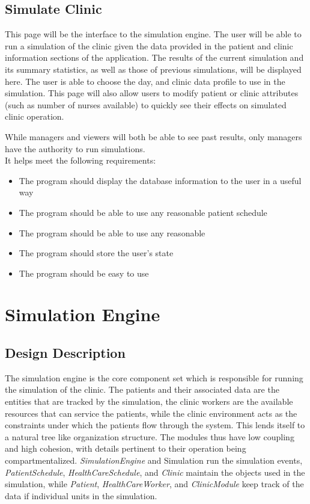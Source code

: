 \documentclass[12pt]{article}
\begin{document}
\subsection{Simulate Clinic}
This page will be the interface to the simulation engine. The user will be able to run a simulation of the clinic given the data provided in the patient and clinic information sections of the application. The results of the current simulation and its summary statistics, as well as those of previous simulations, will be displayed here. The user is able to choose the day, and clinic data profile to use in the simulation. This page will also allow users to modify patient or clinic attributes (such as number of nurses available) to quickly see their effects on simulated clinic operation. 

\noindent \newline
While managers and viewers will both be able to see past results, only managers have the authority to run simulations.
\\
It helps meet the following requirements:
\begin{itemize}
	\item The program should display the database information to the user in a useful way
	\item The program should be able to use any reasonable patient schedule
	\item The program should be able to use any reasonable
	\item The program should store the user's state
	\item The program should be easy to use
\end{itemize}

\section{Simulation Engine}

\subsection{Design Description}
The simulation engine is the core component set which is responsible for running the simulation of the clinic. The patients and their associated data are the entities that are tracked by the simulation, the clinic workers are the available resources that can service the patients, while the clinic environment acts as the constraints under which the patients flow through the system. This lends itself to a natural tree like organization structure. The modules thus have low coupling and high cohesion, with details pertinent to their operation being compartmentalized. \textit{SimulationEngine} and Simulation run the simulation events, \textit{PatientSchedule},\textit{ HealthCareSchedule}, and \textit{Clinic} maintain the objects used in the simulation, while \textit{Patient}, \textit{HealthCareWorker}, and \textit{ClinicModule} keep track of the data if individual units in the simulation.
\end{document}
